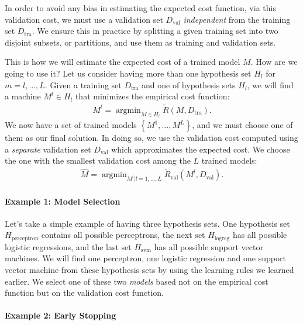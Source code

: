 \documentclass{report}
\DeclareMathOperator*{\argmin}{\arg \min}
\newcommand{\val}{\text{val}}
\newcommand{\tra}{\text{tra}}
\begin{document}
In order to avoid any bias in estimating the expected cost function, via this
validation cost, we must use a validation set $D_{\val}$ {\it independent} from
the training set $D_{\tra}$. We ensure this in practice by splitting a given
training set into two disjoint subsets, or partitions, and use them as training
and validation sets. 

This is how we will estimate the expected cost of a trained model $M$. How are
we going to use it? Let us consider having more than one hypothesis set $H_l$
for $m=l, \ldots, L$. Given a training set $D_{\tra}$ and one of hypothesis sets
$H_l$, we will find a machine $M^l \in H_l$ that minimizes the empirical cost
function:
\begin{align*}
    M^l = \argmin_{M \in H_l} \tilde{R}(M, D_{\tra}).
\end{align*}
We now have a set of trained models $\left\{ M^1, \ldots, M^L \right\}$, and we
must choose one of them as our final solution. In doing so, we use the
validation cost computed using a {\it separate} validation set $D_{\val}$ which
approximates the expected cost. We choose the one with the smallest validation
cost among the $L$ trained models:
\begin{align*}
    \hat{M} = \argmin_{M^l|l=1,\ldots,L} \tilde{R}_{\val}(M^l, D_{\val}).
\end{align*}

\paragraph{Example 1: Model Selection}

Let's take a simple example of having three hypothesis sets. One hypothesis set
$H_{\text{perceptron}}$ contains all possible perceptrons, the next set
$H_{\text{logreg}}$ has all possible logistic regressions, and the last set
$H_{\text{svm}}$ has all possible support vector machines. We will find one
perceptron, one logistic regression and one support vector machine from these
hypothesis sets by using the learning rules we learned earlier.  We select one
of these two {\it models} based not on the empirical cost function but on the
validation cost function. 

\paragraph{Example 2: Early Stopping}
\end{document}
